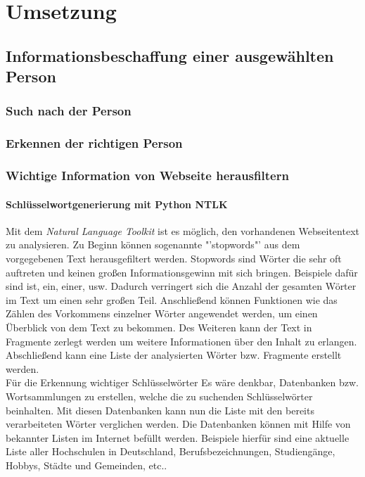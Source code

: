 
\chapter{Umsetzung}  %
\label{cha:} %
\section{Informationsbeschaffung einer ausgewählten Person}
 \subsection{Such nach der Person}
 \subsection{Erkennen der richtigen Person}
 \subsection{Wichtige Information von Webseite herausfiltern}
		\subsubsection{Schlüsselwortgenerierung mit Python NTLK}
		Mit dem \textit{Natural Language Toolkit} ist es möglich, den vorhandenen Webseitentext zu analysieren. Zu Beginn können sogenannte "'stopwords"' aus dem vorgegebenen Text herausgefiltert werden. Stopwords sind Wörter die sehr oft auftreten und keinen großen Informationsgewinn mit sich bringen. Beispiele dafür sind ist, ein, einer, usw. Dadurch verringert sich die Anzahl der gesamten Wörter im Text um einen sehr großen Teil. Anschließend können Funktionen wie das Zählen des Vorkommens einzelner Wörter angewendet werden, um einen Überblick von dem Text zu bekommen. Des Weiteren kann der Text in Fragmente zerlegt werden um weitere Informationen über den Inhalt zu erlangen. Abschließend kann eine Liste der analysierten Wörter bzw. Fragmente erstellt werden.\\
		Für die Erkennung wichtiger Schlüsselwörter
		Es wäre denkbar, Datenbanken bzw. Wortsammlungen zu erstellen, welche die zu suchenden Schlüsselwörter beinhalten. Mit diesen Datenbanken kann nun die Liste mit den bereits verarbeiteten Wörter verglichen werden. Die Datenbanken können mit Hilfe von bekannter Listen im Internet befüllt werden. Beispiele hierfür sind eine aktuelle Liste aller Hochschulen in Deutschland, Berufsbezeichnungen, Studiengänge, Hobbys, Städte und Gemeinden, etc..
		
